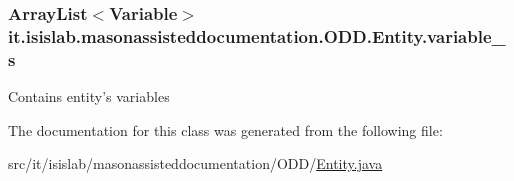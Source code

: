 \hypertarget{classit_1_1isislab_1_1masonassisteddocumentation_1_1_o_d_d_1_1_entity_a238b1599f0dde81c9e906abf57c120e6}{
\subsubsection[{variable\-\_\-s}]{\setlength{\rightskip}{0pt plus 5cm}Array\-List$<${\bf Variable}$>$ it.\-isislab.\-masonassisteddocumentation.\-O\-D\-D.\-Entity.\-variable\-\_\-s\hspace{0.3cm}{\ttfamily [private]}}}\label{classit_1_1isislab_1_1masonassisteddocumentation_1_1_o_d_d_1_1_entity_a238b1599f0dde81c9e906abf57c120e6}
Contains entity's variables 

The documentation for this class was generated from the following file\-:\begin{DoxyCompactItemize}
\item 
src/it/isislab/masonassisteddocumentation/\-O\-D\-D/\hyperlink{_entity_8java}{Entity.\-java}\end{DoxyCompactItemize}
